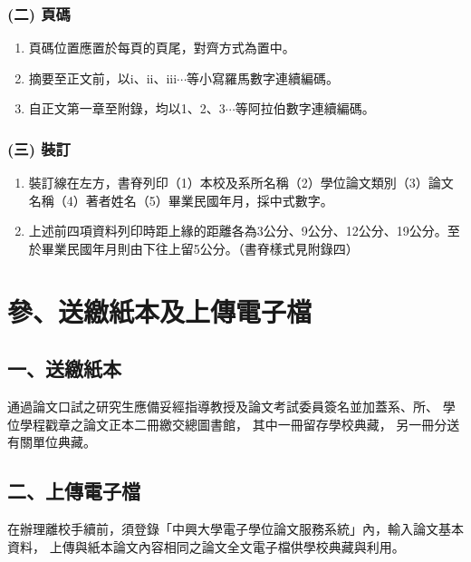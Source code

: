 \documentclass[12pt,oneside,openany,a4paper]{book}
\begin{document}
\subsection{(二) 頁碼}
\begin{enumerate}
    \item 頁碼位置應置於每頁的頁尾，對齊方式為置中。
    \item 摘要至正文前，以i、ii、iii$\cdots$等小寫羅馬數字連續編碼。
    \item 自正文第一章至附錄，均以1、2、3$\cdots$等阿拉伯數字連續編碼。
\end{enumerate}

\subsection{(三) 裝訂}
\begin{enumerate}
    \item 裝訂線在左方，書脊列印（1）本校及系所名稱（2）學位論文類別（3）論文名稱（4）著者姓名（5）畢業民國年月，採中式數字。
    \item 上述前四項資料列印時距上緣的距離各為3公分、9公分、12公分、19公分。至於畢業民國年月則由下往上留5公分。（書脊樣式見附錄四）
\end{enumerate}

\chapter{參、送繳紙本及上傳電子檔}
\section{一、送繳紙本}
通過論文口試之研究生應備妥經指導教授及論文考試委員簽名並加蓋系、所、
學位學程戳章之論文正本二冊繳交總圖書館，
其中一冊留存學校典藏，
另一冊分送有關單位典藏。

\section{二、上傳電子檔}
在辦理離校手續前，須登錄「中興大學電子學位論文服務系統」內，輸入論文基本資料，
上傳與紙本論文內容相同之論文全文電子檔供學校典藏與利用。
\end{document}
